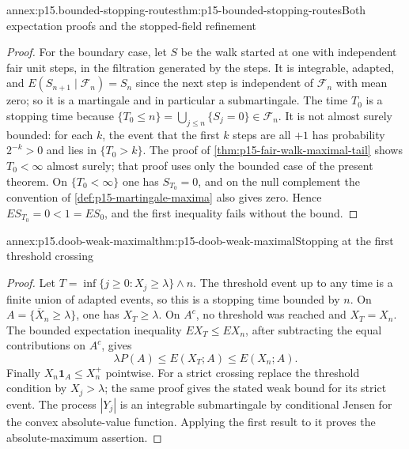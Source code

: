 \begin{annexitem}{annex:p15.bounded-stopping-routes}{thm:p15-bounded-stopping-routes}{Both expectation proofs and the stopped-field refinement}
\begin{proof}
For the boundary case, let \(S\) be the walk started at one with
independent fair unit steps, in the filtration generated by the steps.
It is integrable, adapted, and \(E(S_{n+1}\mid\mathcal F_n)=S_n\) since
the next step is independent of \(\mathcal F_n\) with mean zero; so it is
a martingale and in particular a submartingale.
The time \(T_0\) is a stopping time because
\(\{T_0\leq n\}=\bigcup_{j\leq n}\{S_j=0\}\in\mathcal F_n\).
It is not almost surely bounded: for each \(k\), the event that the
first \(k\) steps are all \(+1\) has probability \(2^{-k}>0\) and lies in
\(\{T_0>k\}\). The proof of \cref{thm:p15-fair-walk-maximal-tail}
shows \(T_0<\infty\) almost surely; that proof uses only the bounded
case of the present theorem. On \(\{T_0<\infty\}\) one has
\(S_{T_0}=0\), and on the null complement the convention of
\cref{def:p15-martingale-maxima} also gives zero. Hence
\(ES_{T_0}=0<1=ES_0\), and the first inequality fails without the bound.
\end{proof}
\end{annexitem}

\begin{annexitem}{annex:p15.doob-weak-maximal}{thm:p15-doob-weak-maximal}{Stopping at the first threshold crossing}
\begin{proof}
Let \(T=\inf\{j\geq0:X_j\geq\lambda\}\wedge n\).
The threshold event up to any time is a finite union of adapted
events, so this is a stopping time bounded by \(n\).
On \(A=\{\overline X_n\geq\lambda\}\), one has \(X_T\geq\lambda\).
On \(A^c\), no threshold was reached and \(X_T=X_n\).
The bounded expectation inequality \(EX_T\leq EX_n\), after
subtracting the equal contributions on \(A^c\), gives
\[
                      \lambda P(A)\leq E(X_T;A)\leq E(X_n;A).
\]
Finally \(X_n\mathbf1_A\leq X_n^+\) pointwise.
For a strict crossing replace the threshold condition by
\(X_j>\lambda\); the same proof gives the stated weak bound
for its strict event.
The process \(|Y_j|\) is an integrable submartingale by conditional
Jensen for the convex absolute-value function. Applying the first
result to it proves the absolute-maximum assertion.
\end{proof}
\end{annexitem}

